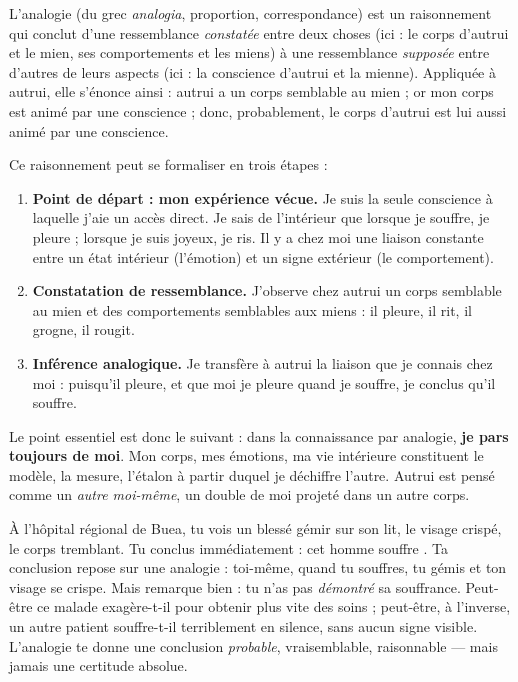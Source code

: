 \documentclass[11pt]{article}
\newcommand{\cle}[1]{{\popxbold\color{popdark}#1}}
\begin{document}
\begin{definition}[L'analogie]
L'\cle{analogie} (du grec \emph{analogia}, proportion, correspondance) est un raisonnement qui conclut d'une ressemblance \emph{constatée} entre deux choses (ici : le corps d'autrui et le mien, ses comportements et les miens) à une ressemblance \emph{supposée} entre d'autres de leurs aspects (ici : la conscience d'autrui et la mienne). Appliquée à autrui, elle s'énonce ainsi : autrui a un corps semblable au mien ; or mon corps est animé par une conscience ; donc, probablement, le corps d'autrui est lui aussi animé par une conscience.
\end{definition}

Ce raisonnement peut se formaliser en trois étapes :

\begin{enumerate}
\item \textbf{Point de départ : mon expérience vécue.} Je suis la seule conscience à laquelle j'aie un accès direct. Je sais de l'intérieur que lorsque je souffre, je pleure ; lorsque je suis joyeux, je ris. Il y a chez moi une liaison constante entre un état intérieur (l'émotion) et un signe extérieur (le comportement).
\item \textbf{Constatation de ressemblance.} J'observe chez autrui un corps semblable au mien et des comportements semblables aux miens : il pleure, il rit, il grogne, il rougit.
\item \textbf{Inférence analogique.} Je transfère à autrui la liaison que je connais chez moi : puisqu'il pleure, et que moi je pleure quand je souffre, je conclus qu'il souffre.
\end{enumerate}

Le point essentiel est donc le suivant : dans la connaissance par analogie, \textbf{je pars toujours de moi}. Mon corps, mes émotions, ma vie intérieure constituent le modèle, la mesure, l'étalon à partir duquel je déchiffre l'autre. Autrui est pensé comme un \emph{autre moi-même}, un double de moi projeté dans un autre corps.

\begin{exemplebox}
À l'hôpital régional de Buea, tu vois un blessé gémir sur son lit, le visage crispé, le corps tremblant. Tu conclus immédiatement : \guillemotleft cet homme souffre \guillemotright. Ta conclusion repose sur une analogie : toi-même, quand tu souffres, tu gémis et ton visage se crispe. Mais remarque bien : tu n'as pas \emph{démontré} sa souffrance. Peut-être ce malade exagère-t-il pour obtenir plus vite des soins ; peut-être, à l'inverse, un autre patient souffre-t-il terriblement en silence, sans aucun signe visible. L'analogie te donne une conclusion \emph{probable}, vraisemblable, raisonnable — mais jamais une certitude absolue.
\end{exemplebox}
\end{document}
